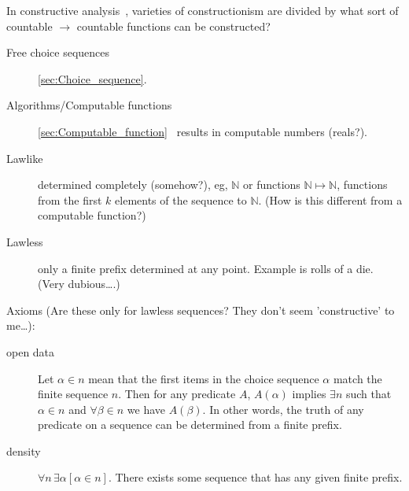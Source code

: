 \label{Constructive analysis}

In constructive 
analysis~\cite{wiki:Constructive_analysis,
Bridger:2019,henle:2012:numbers},
varieties of constructionism are divided by
what sort of countable $\rightarrow$ countable functions can be 
constructed?~\cite{wiki:Constructivism_philosophy_of_mathematics}
\begin{description}
\item[Free choice sequences] 
\autoref{sec:Choice_sequence}\cite{wiki:Choice_sequence}.
\item[Algorithms/Computable functions] 
\autoref{sec:Computable_function}~\cite{wiki:Computable_function}
 results in computable numbers (reals?).
\end{description}

\label{sec:Choice_sequences}

\begin{description}
\item[Lawlike] determined completely (somehow?),
eg, $\mathbb{N}$ or functions $\mathbb{N} \mapsto \mathbb{N}$,
functions from the first $k$ elements of the sequence to 
$\mathbb{N}$.
(How is this different from a computable function?)
\item[Lawless] only a finite prefix determined at any point.
Example is rolls of a die. (Very dubious\ldots.)
\end{description}

Axioms 
(Are these only for lawless sequences?
They don't seem 'constructive' to me\ldots):
\begin{description}
\item[open data] Let $\alpha \in n$ mean that the first items
in the choice sequence $\alpha$ match the finite sequence $n$.
Then for any predicate $A$,
$A(\alpha )$ implies  $\exists n$ such that
$\alpha \in n$ and $\forall \beta \in n$ we have $A(\beta )$.
In other words, the truth of any predicate on a sequence can be
determined from a finite prefix.
\item[density] $\forall n\,\exists \alpha [\alpha \in n]$.
There exists some sequence that has any given finite prefix.
\end{description}


\label{sec:Computable_function}
\cite{wiki:Computable_function}

